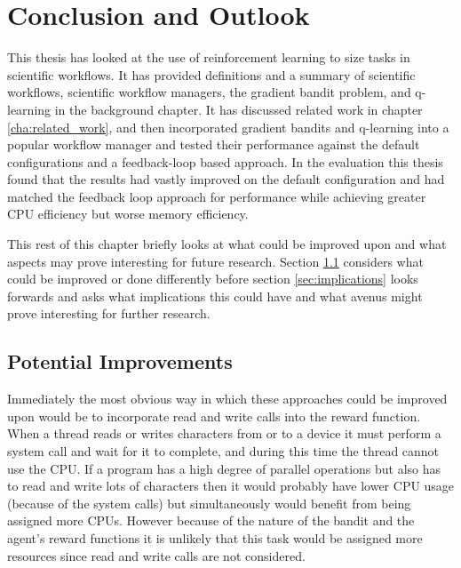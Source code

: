 
\cleardoublepage
\chapter{Conclusion and Outlook}
\label{cha:conclusion}

This thesis has looked at the use of reinforcement learning to size tasks in scientific workflows. It has provided definitions and a summary of scientific workflows, scientific workflow managers, the gradient bandit problem, and q-learning in the background chapter. It has discussed related work in chapter \ref{cha:related_work}, and then incorporated gradient bandits and q-learning into a popular workflow manager and tested their performance against the default configurations and a feedback-loop based approach. In the evaluation this thesis found that the results had vastly improved on the default configuration and had matched the feedback loop approach for performance while achieving greater CPU efficiency but worse memory efficiency.

This rest of this chapter briefly looks at what could be improved upon and what aspects may prove interesting for future research. Section \ref{sec:pot_improvements} considers what could be improved or done differently before section \ref{sec:implications} looks forwards and asks what implications this could have and what avenus might prove interesting for further research.

\section{Potential Improvements}
\label{sec:pot_improvements}

Immediately the most obvious way in which these approaches could be improved upon would be to incorporate read and write calls into the reward function. When a thread reads or writes characters from or to a device it must perform a system call and wait for it to complete, and during this time the thread cannot use the CPU. If a program has a high degree of parallel operations but also has to read and write lots of characters then it would probably have lower CPU usage (because of the system calls) but simultaneously would benefit from being assigned more CPUs. However because of the nature of the bandit and the agent’s reward functions it is unlikely that this task would be assigned more resources since read and write calls are not considered.

